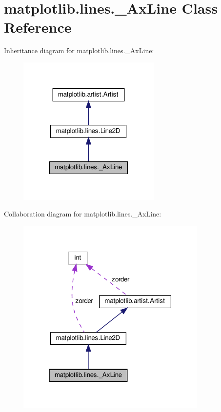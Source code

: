 \hypertarget{classmatplotlib_1_1lines_1_1__AxLine}{}\section{matplotlib.\+lines.\+\_\+\+Ax\+Line Class Reference}
\label{classmatplotlib_1_1lines_1_1__AxLine}


Inheritance diagram for matplotlib.\+lines.\+\_\+\+Ax\+Line\+:
\nopagebreak
\begin{figure}[H]
\begin{center}
\leavevmode
\includegraphics[width=200pt]{classmatplotlib_1_1lines_1_1__AxLine__inherit__graph}
\end{center}
\end{figure}


Collaboration diagram for matplotlib.\+lines.\+\_\+\+Ax\+Line\+:
\nopagebreak
\begin{figure}[H]
\begin{center}
\leavevmode
\includegraphics[width=267pt]{classmatplotlib_1_1lines_1_1__AxLine__coll__graph}
\end{center}
\end{figure}
